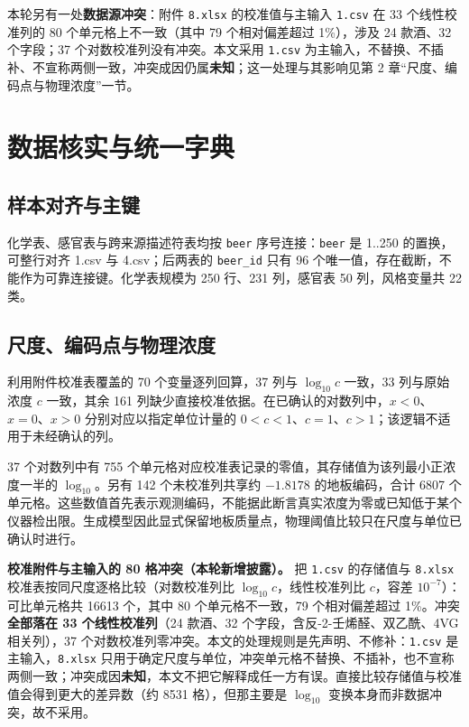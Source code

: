 \documentclass[11pt,a4paper]{article}
\begin{document}
本轮另有一处\textbf{数据源冲突}：附件 \texttt{8.xlsx} 的校准值与主输入
\texttt{1.csv} 在 33 个线性校准列的 80 个单元格上不一致（其中 79
个相对偏差超过 1\%），涉及 24 款酒、32 个字段；37
个对数校准列没有冲突。本文采用 \texttt{1.csv}
为主输入，不替换、不插补、不宣称两侧一致，冲突成因仍属\textbf{未知}；这一处理与其影响见第
2 章``尺度、编码点与物理浓度''一节。

\section{数据核实与统一字典}\label{ux6570ux636eux6838ux5b9eux4e0eux7edfux4e00ux5b57ux5178}

\subsection{样本对齐与主键}\label{ux6837ux672cux5bf9ux9f50ux4e0eux4e3bux952e}

化学表、感官表与跨来源描述符表均按 \texttt{beer} 序号连接：\texttt{beer}
是 1..250 的置换，可整行对齐 1.csv 与 4.csv；后两表的 \texttt{beer\_id}
只有 96 个唯一值，存在截断，不能作为可靠连接键。化学表规模为 250 行、231
列，感官表 50 列，风格变量共 22 类。

\subsection{尺度、编码点与物理浓度}\label{ux5c3aux5ea6ux7f16ux7801ux70b9ux4e0eux7269ux7406ux6d53ux5ea6}

利用附件校准表覆盖的 70 个变量逐列回算，37 列与 \(\log_{10}c\) 一致，33
列与原始浓度 \(c\) 一致，其余 161
列缺少直接校准依据。在已确认的对数列中，\(x<0\)、\(x=0\)、\(x>0\)
分别对应以指定单位计量的
\(0<c<1\)、\(c=1\)、\(c>1\)；该逻辑不适用于未经确认的列。

37 个对数列中有 755
个单元格对应校准表记录的零值，其存储值为该列最小正浓度一半的
\(\log_{10}\)。另有 142 个未校准列共享约 \(-1.8178\) 的地板编码，合计
6807
个单元格。这些数值首先表示观测编码，不能据此断言真实浓度为零或已知低于某个仪器检出限。生成模型因此显式保留地板质量点，物理阈值比较只在尺度与单位已确认时进行。

\textbf{校准附件与主输入的 80 格冲突（本轮新增披露）。} 把
\texttt{1.csv} 的存储值与 \texttt{8.xlsx}
校准表按同尺度逐格比较（对数校准列比 \(\log_{10}c\)，线性校准列比
\(c\)，容差 \(10^{-7}\)）：可比单元格共 16613 个，其中 80
个单元格不一致，79 个相对偏差超过 1\%。冲突\textbf{全部落在 33
个线性校准列}（24 款酒、32 个字段，含反-2-壬烯醛、双乙酰、4VG
相关列），37
个对数校准列零冲突。本文的处理规则是先声明、不修补：\texttt{1.csv}
是主输入，\texttt{8.xlsx}
只用于确定尺度与单位，冲突单元格不替换、不插补，也不宣称两侧一致；冲突成因\textbf{未知}，本文不把它解释成任一方有误。直接比较存储值与校准值会得到更大的差异数（约
8531 格），但那主要是 \(\log_{10}\) 变换本身而非数据冲突，故不采用。
\end{document}
